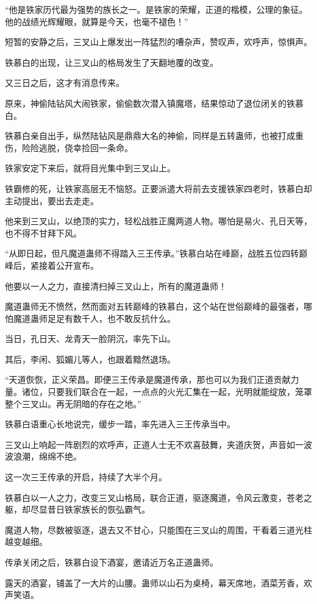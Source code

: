 \begin{this_body}
“他是铁家历代最为强势的族长之一。是铁家的荣耀，正道的楷模，公理的象征。他的战绩光辉耀眼，就算是今天，也毫不褪色！”

短暂的安静之后，三叉山上爆发出一阵猛烈的嘈杂声，赞叹声，欢呼声，惊惧声。

铁慕白的出现，让三叉山的格局发生了天翻地覆的改变。

又三日之后，这才有消息传来。

原来，神偷陆钻风大闹铁家，偷偷数次潜入镇魔塔，结果惊动了退位闭关的铁慕白。

铁慕白亲自出手，纵然陆钻风是鼎鼎大名的神偷，同样是五转蛊师，也被打成重伤，险险逃脱，侥幸捡回一条命。

铁家安定下来后，就将目光集中到三叉山上。

铁霸修的死，让铁家高层无不恼怒。正要派遣大将前去支援铁家四老时，铁慕白却主动提出，要出去走走。

他来到三叉山，以绝顶的实力，轻松战胜正魔两道人物。哪怕是易火、孔日天等，也不得不甘拜下风。

“从即日起，但凡魔道蛊师不得踏入三王传承。”铁慕白站在峰巅，战胜五位四转巅峰后，紧接着公开宣布。

他要以一人之力，直接清扫掉三叉山上，所有的魔道蛊师！

魔道蛊师无不愤然，然而面对五转巅峰的铁慕白，这个站在世俗巅峰的最强者，哪怕魔道蛊师足足有数千人，也不敢反抗什么。

当日，孔日天、龙青天一脸阴沉，率先下山。

其后，李闲、狐媚儿等人，也跟着黯然退场。

“天道恢恢，正义荣昌。即便三王传承是魔道传承，那也可以为我们正道贡献力量。诸位，只要我们联合在一起，一点点的火光汇集在一起，光明就能绽放，笼罩整个三叉山。再无阴暗的存在之地。”

铁慕白语重心长地说完，缓步一踏，率先进入三王传承当中。

三叉山上响起一阵剧烈的欢呼声，正道人士无不欢喜鼓舞，夹道庆贺，声音如一波波浪潮，绵绵不绝。

这一次三王传承的开启，持续了大半个月。

铁慕白以一人之力，改变三叉山格局，联合正道，驱逐魔道，令风云激变，苍老之躯，却尽显昔日铁家族长的恢弘霸气。

魔道人物，尽数被驱逐，退去又不甘心，只能围在三叉山的周围，干看着三道光柱越变越细。

传承关闭之后，铁慕白设下酒宴，邀请近万名正道蛊师。

露天的酒宴，铺盖了一大片的山腰。蛊师以山石为桌椅，幕天席地，酒菜芳香，欢声笑语。


\end{this_body}
